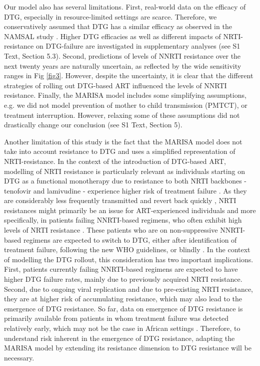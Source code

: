 \documentclass[10pt,letterpaper]{article}
\begin{document}
Our model also has several limitations. First, real-world data on the efficacy of DTG, especially in resource-limited settings are scarce. Therefore, we conservatively assumed that DTG has a similar efficacy as observed in the NAMSAL study \cite{Group2019}. Higher DTG efficacies as well as different impacts of NRTI-resistance on DTG-failure are investigated in supplementary analyses (see S1 Text, Section 5.3). Second, predictions of levels of NNRTI resistance over the next twenty years are naturally uncertain, as reflected by the wide sensitivity ranges in Fig \ref{fig3}. However, despite the uncertainty, it is clear that the different strategies of rolling out DTG-based ART influenced the levels of NNRTI resistance. Finally, the MARISA model includes some simplifying assumptions, e.g. we did not model prevention of mother to child transmission (PMTCT), or treatment interruption. However, relaxing some of these assumptions did not drastically change our conclusion (see S1 Text, Section 5).

Another limitation of this study is the fact that the MARISA model does not take into account resistance to DTG and uses a simplified representation of NRTI-resistance. In the context of the introduction of DTG-based ART, modelling of NRTI resistance is particularly relevant as individuals starting on DTG as a functional monotherapy due to resistance to both NRTI backbones - tenofovir and lamivudine - experience higher risk of treatment failure \cite{Wandeler2019}. As they are considerably less frequently transmitted \cite{WHO2017} and revert back quickly \cite{rev,Kuhnert2018}, NRTI resistances might primarily be an issue for ART-experienced individuals and more specifically, in patients failing NNRTI-based regimens, who often exhibit high levels of NRTI resistance \cite{Steegen2017}. These patients who are on non-suppressive NNRTI-based regimens are expected to switch to DTG, either after identification of treatment failure, following the new WHO guidelines, or blindly \cite{Inzaule2019}. In the context of modelling the DTG rollout, this consideration has two important implications. First, patients currently failing NNRTI-based regimens are expected to have higher DTG failure rates, mainly due to previously acquired NRTI resistance. Second, due to ongoing viral replication and due to pre-existing NRTI resistance, they are at higher risk of accumulating resistance, which may also lead to the emergence of DTG resistance. So far, data on emergence of DTG resistance is primarily available from patients in whom treatment failure was detected relatively early, which may not be the case in African settings \cite{Venter2019}. Therefore, to understand risk inherent in the emergence of DTG resistance, adapting the MARISA model by extending its resistance dimension to DTG resistance will be necessary.
\end{document}
